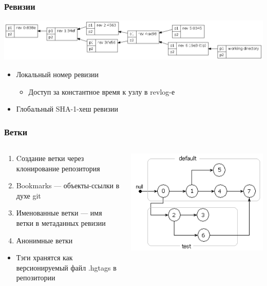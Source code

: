 \documentclass{../../slides-style}
\begin{document}
	\begin{frame}
		\frametitle{Ревизии}
		\begin{center}
			\includegraphics[width=\textwidth]{mercurialRevisions.png}
		\end{center}
		\begin{itemize}
			\item Локальный номер ревизии
			\begin{itemize}
				\item Доступ за константное время к узлу в revlog-е
			\end{itemize}
			\item Глобальный SHA-1-хеш ревизии
		\end{itemize}
	\end{frame}

	\begin{frame}
		\frametitle{Ветки}
		\begin{columns}
			\begin{column}{0.6\textwidth}
				\begin{enumerate}
					\item Cоздание ветки через клонирование репозитория
					\item Bookmarks --- объекты-ссылки в духе git
					\item Именованные ветки --- имя ветки в метаданных ревизии
					\item Анонимные ветки
				\end{enumerate}
				\begin{itemize}
					\item Тэги хранятся как версионируемый файл .hgtags в репозитории
				\end{itemize}
			\end{column}
			\begin{column}{0.4\textwidth}
				\includegraphics[width=\textwidth]{mercurialBranches.png}
			\end{column}
		\end{columns}
	\end{frame}
\end{document}
